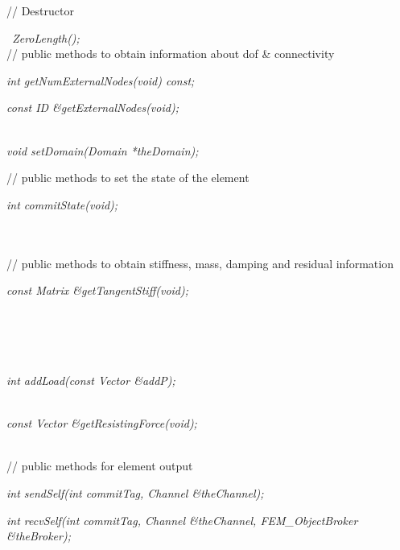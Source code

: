 // Destructor 

{\em    ~ZeroLength();} \\ 


   // public methods to obtain information about dof \& connectivity 

{\em    int getNumExternalNodes(void) const;} 

{\em    const ID \&getExternalNodes(void);} 

 \\	
{\em    void setDomain(Domain *theDomain);} 


   // public methods to set the state of the element    

{\em    int commitState(void);} 

 \\        
 \\        

   // public methods to obtain stiffness, mass, damping and residual information    

{\em    const Matrix \&getTangentStiff(void);} 

 \\    
 \\    
 \\    

 \\	
{\em    int addLoad(const Vector \&addP);} 

 \\    
{\em    const Vector \&getResistingForce(void);} 

 \\            

   // public methods for element output 

{\em    int sendSelf(int commitTag, Channel \&theChannel);} 

{\em    int recvSelf(int commitTag, Channel \&theChannel, FEM\_ObjectBroker \&theBroker);} 

 \\    
 \\    

